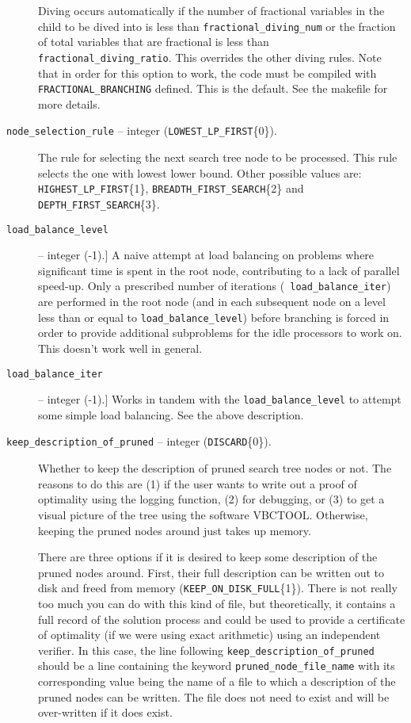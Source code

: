 \begin{description}
Diving occurs automatically if the number of fractional variables in
the child to be dived into is less than {\tt fractional\_diving\_num}
or the fraction of total variables that are fractional is less than {\tt
fractional\_diving\_ratio}. This overrides the other diving rules.
Note that in order for this option to work, the code must be compiled
with {\tt FRACTIONAL\_BRANCHING} defined. This is the default. See the
makefile for more details.

\item[{\tt node\_selection\_rule} -- integer ({\tt LOWEST\_LP\_FIRST}\{0\}).]
The rule for selecting the next search tree node to be processed. This rule
selects the one with lowest lower bound. Other possible values are: {\tt
HIGHEST\_LP\_FIRST}\{1\}, {\tt BREADTH\_FIRST\_SEARCH}\{2\} and {\tt
DEPTH\_FIRST\_SEARCH}\{3\}.

\item[{\tt load\_balance\_level}] -- integer (-1).]
A naive attempt at load balancing on problems where significant time
is spent in the root node, contributing to a lack of parallel
speed-up. Only a prescribed number of iterations ({\tt
load\_balance\_iter}) are performed in the root node (and in each
subsequent node on
a level less than or equal to {\tt load\_balance\_level}) before
branching is forced in order to provide additional subproblems for the
idle processors to work on. This doesn't work well in general.

\item[{\tt load\_balance\_iter}] -- integer (-1).]
Works in tandem with the {\tt load\_balance\_level} to attempt some
simple load balancing. See the above description.

\item[{\tt keep\_description\_of\_pruned} -- integer ({\tt DISCARD}\{0\}).]
Whether to keep the description of pruned search tree nodes or not.
The reasons to do this are (1) if the user wants to write out a proof
of optimality using the logging function, (2) for debugging, or (3) to
get a visual picture of the tree using the software VBCTOOL.
Otherwise, keeping the pruned nodes around just takes up memory. 

There are three options if it is desired to keep some description of
the pruned nodes around. First, their full description can be written
out to disk and freed from memory ({\tt KEEP\_ON\_DISK\_FULL}\{1\}). There
is not really too much you can do with this kind of file, but
theoretically, it contains a full record of the solution process and
could be used to provide a certificate of optimality (if we were using
exact arithmetic) using an independent verifier. In this case, the
line following {\tt keep\_description\_of\_pruned} should be a line
containing the keyword {\tt pruned\_node\_file\_name} with its
corresponding value being the name of a file to which a description of
the pruned nodes can be written. The file does not need to exist and
will be over-written if it does exist.


\end{description}
